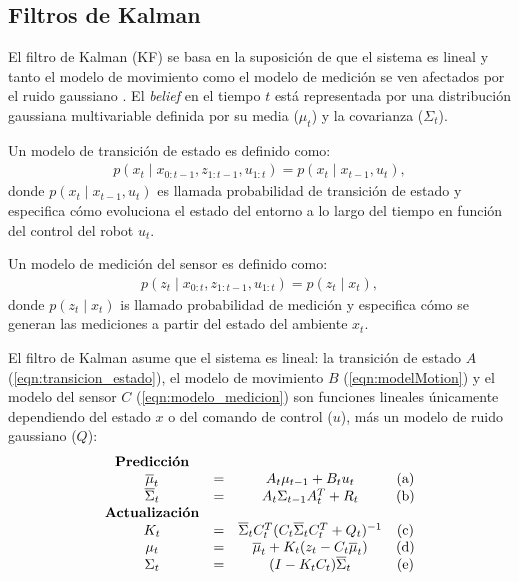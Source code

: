 \subsection{Filtros de Kalman}
El filtro de Kalman (KF) se basa en la suposición de que el sistema es lineal y tanto 
el modelo de movimiento como el modelo de medición se ven afectados por el ruido 
gaussiano \cite{jetto1999development}. El \textit{belief} en el tiempo $t$ está 
representada por una distribución gaussiana multivariable definida por su media 
($\mu_{t}$) y la covarianza ($\Sigma_{t}$).

Un modelo de transici\'on de estado es definido como:
\begin{align}
\label{eqn:transicion_estado}
p(x_{t}\mid x_{0:t-1}, z_{1:t-1}, u_{1:t}) = p(x_{t}\mid x_{t-1}, u_{t}),
\end{align}
donde $p(x_{t}\mid x_{t-1}, u_{t})$ es llamada probabilidad de transición de estado 
y especifica cómo evoluciona el estado del entorno a lo largo del tiempo en función 
del control del robot $u_{t}$.

Un modelo de medici\'on del sensor es definido como:
\begin{align}
\label{eqn:modelo_medicion}
p(z_{t}\mid x_{0:t}, z_{1:t-1}, u_{1:t}) = p (z_{t}\mid x_{t}),
\end{align}
donde $p(z_{t}\mid x_{t})$ is llamado probabilidad de medición y especifica cómo se 
generan las mediciones a partir del estado del ambiente $x_{t}$.

El filtro de Kalman asume que el sistema es lineal: la transición de estado 
$A$ (\ref{eqn:transicion_estado}), el modelo de movimiento $B$ (\ref{eqn:modelMotion})  
y el modelo del sensor $C$ (\ref{eqn:modelo_medicion}) son funciones lineales únicamente 
dependiendo del estado $x$ o del comando de control ($u$), más un modelo 
de ruido gaussiano ($Q$):
\begin{equation*}
\label{eqn: Kalman Filter}
\begin{matrix}
\textrm{\textbf{Predicción}}\\
\overline{\mu}_{t} &= &A_{t}\mu_{t-1} + B_{t} u_{t} &\textrm{(a)}\\
\overline{\Sigma}_{t} &= &A_{t}\Sigma_{t-1} A_{t}^{T} + R_{t} &\textrm{(b)}\\
\textrm{\textbf{Actualización}}\\
K_{t} &= &\overline{\Sigma}_{t}C_{t}^{T}(C_{t}\overline{\Sigma}_{t}C_{t}^{T} + Q_{t})^{-1} &\textrm{(c)}\\
\mu_{t} &= &\overline{\mu}_{t} + K_{t}(z_{t} - C_{t}\overline{\mu}_{t}) &\textrm{(d)}\\
\Sigma_{t} &= &(I - K_{t}C_{t})\overline{\Sigma}_{t} &\textrm{(e)}\\
\end{matrix}
\end{equation*}

